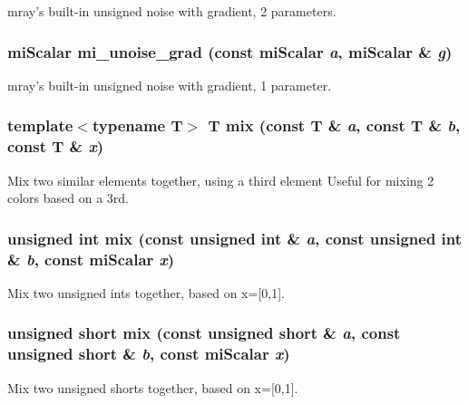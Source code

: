 mray's built-in unsigned noise with gradient, 2 parameters. 

\subsubsection{\setlength{\rightskip}{0pt plus 5cm}mi\-Scalar mi\_\-unoise\_\-grad (const mi\-Scalar {\em a}, mi\-Scalar \& {\em g})\hspace{0.3cm}{\tt  [inline]}}\label{namespacersl_a119}


mray's built-in unsigned noise with gradient, 1 parameter. 

\subsubsection{\setlength{\rightskip}{0pt plus 5cm}template$<$typename T$>$ T mix (const T \& {\em a}, const T \& {\em b}, const T \& {\em x})\hspace{0.3cm}{\tt  [inline]}}\label{namespacersl_a23}


Mix two similar elements together, using a third element Useful for mixing 2 colors based on a 3rd. 
\subsubsection{\setlength{\rightskip}{0pt plus 5cm}unsigned int mix (const unsigned int \& {\em a}, const unsigned int \& {\em b}, const mi\-Scalar {\em x})\hspace{0.3cm}{\tt  [inline]}}\label{namespacersl_a22}


Mix two unsigned ints together, based on x=[0,1]. 

\subsubsection{\setlength{\rightskip}{0pt plus 5cm}unsigned short mix (const unsigned short \& {\em a}, const unsigned short \& {\em b}, const mi\-Scalar {\em x})\hspace{0.3cm}{\tt  [inline]}}\label{namespacersl_a21}


Mix two unsigned shorts together, based on x=[0,1]. 

